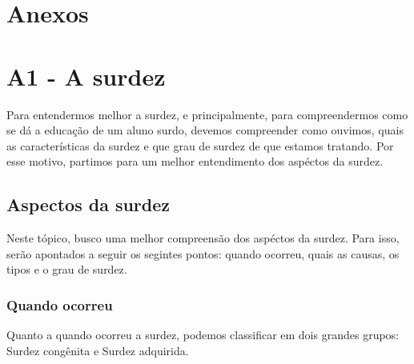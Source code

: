 \documentclass[brasil]{abnt}
\begin{document}
	
		

  

	\nocite{audi}
	\nocite{aud}
	\nocite{bev}
	\nocite{bot}
	\nocite{capo}
	\nocite{car}
	\nocite{coch}
	\nocite{cou}
	\nocite{dada}
	\nocite{Ubi}
	\nocite{amore}
	\nocite{dec}
	\nocite{fil}
	\nocite{gold}
	\nocite{lacerd}
	\nocite{lip}
	\nocite{machado}
	\nocite{PC}
	\nocite{macha}
	\nocite{martins}
	\nocite{mm}
	\nocite{moraes}
	\nocite{mon}
	\nocite{nogu}
	\nocite{nunes}
	\nocite{Wiki}
	\nocite{oliveira}
	\nocite{Almeida}
	\nocite{Paul}
	\nocite{pei}
	\nocite{crist}
	\nocite{phs}
	\nocite{quas}
	\nocite{qua}
	\nocite{qep}
	\nocite{quads}
	\nocite{sado}
	\nocite{Sales}
	\nocite{san}
	\nocite{coelho}
	\nocite{sp}
	\nocite{ei}
	\nocite{silva}
	\nocite{soares}
	\nocite{sou}
	\nocite{stro}
	\nocite{qes}
	\nocite{vs}
	\nocite{vieira}
    
\chapter*{Anexos}

\chapter*{A1 - A surdez}
	Para entendermos melhor a surdez, e principalmente, para compreendermos como se dá a educação de um aluno surdo, devemos compreender como ouvimos, quais as características da surdez e 
	que grau de surdez de que estamos tratando. Por esse motivo, partimos para um melhor entendimento dos aspéctos da surdez.	
			
		\section{Aspectos da surdez}
			Neste tópico, busco uma melhor compreensão dos aspéctos da surdez. Para isso, serão apontados a seguir os segintes pontos: quando ocorreu, 
			quais as causas, os tipos e o grau de surdez. 
			
			\subsection{Quando ocorreu}
				Quanto a quando ocorreu a surdez, podemos classificar em dois grandes grupos: Surdez congênita e Surdez adquirida. 
				
\end{document}
